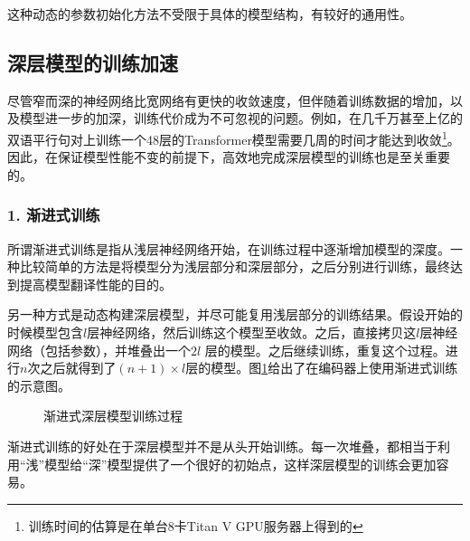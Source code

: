 \parinterval 这种动态的参数初始化方法不受限于具体的模型结构，有较好的通用性。


\subsection{深层模型的训练加速}

\parinterval 尽管窄而深的神经网络比宽网络有更快的收敛速度，但伴随着训练数据的增加，以及模型进一步的加深，训练代价成为不可忽视的问题。例如，在几千万甚至上亿的双语平行句对上训练一个48层的Transformer模型需要几周的时间才能达到收敛\footnote[5]{训练时间的估算是在单台8卡Titan V GPU服务器上得到的}。因此，在保证模型性能不变的前提下，高效地完成深层模型的训练也是至关重要的。


\subsubsection{1. 渐进式训练}

\parinterval 所谓渐进式训练是指从浅层神经网络开始，在训练过程中逐渐增加模型的深度。一种比较简单的方法是将模型分为浅层部分和深层部分，之后分别进行训练，最终达到提高模型翻译性能的目的。

\parinterval 另一种方式是动态构建深层模型，并尽可能复用浅层部分的训练结果。假设开始的时候模型包含$l$层神经网络，然后训练这个模型至收敛。之后，直接拷贝这$l$层神经网络（包括参数），并堆叠出一个$2l$ 层的模型。之后继续训练，重复这个过程。进行$n$次之后就得到了$(n+1) \times l$层的模型。图\ref{fig:15-15}给出了在编码器上使用渐进式训练的示意图。

\begin{figure}[htp]
\centering

\caption{渐进式深层模型训练过程}
\label{fig:15-15}
\end{figure}

\parinterval 渐进式训练的好处在于深层模型并不是从头开始训练。每一次堆叠，都相当于利用“浅”模型给“深”模型提供了一个很好的初始点，这样深层模型的训练会更加容易。

